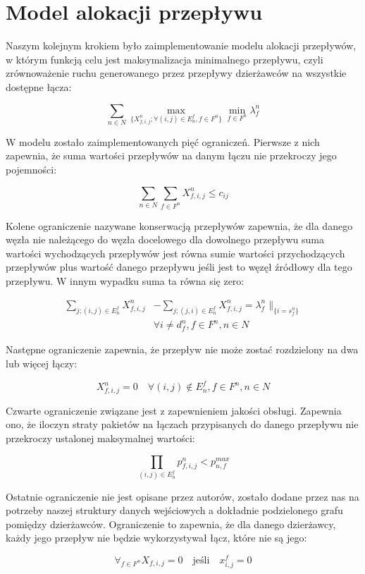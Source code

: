 \section{Model alokacji przepływu}

Naszym kolejnym krokiem było zaimplementowanie modelu alokacji przepływów, w
którym funkcją celu jest maksymalizacja minimalnego przepływu, czyli zrównoważenie
ruchu generowanego przez przepływy dzierżawców na wszystkie dostępne łącza:

\begin{equation}
  \sum_{n \in N} \max_{\{X_{f,i,j}^n;\forall{(i,j)} \in E_n^f,f \in F^n\}} \min_{f \in F^n}\lambda_f^n
\end{equation}

W modelu zostało zaimplementowanych pięć ograniczeń. Pierwsze z nich zapewnia,
że suma wartości przepływów na danym łączu nie przekroczy jego pojemności:

\begin{equation}
  \sum_{n \in N} \sum_{f \in F^n} X_{f,i,j}^n \le c_{ij}
\end{equation}

Kolene ograniczenie nazywane konserwacją przepływów zapewnia, że dla danego węzła
nie należącego do węzła docelowego dla dowolnego przepływu suma wartości wychodzących
przepływów jest równa sumie wartości przychodzących przepływów plus wartość danego
przepływu jeśli jest to węzęł źródłowy dla tego przepływu. W innym wypadku suma ta
równa się zero:

\begin{equation}
\begin{align*}
  \sum_{j;(i,j) \in E_n^f} X_{f,i,j}^n &- \sum_{j;(j,i) \in E_n^f} X_{f,i,j}^n = \lambda_f^n \parallel_{\{i=s_f^n\}} \\
  & \forall{i} \ne d_f^n, f \in F^n, n \in N
\end{align*}
\end{equation}

Następne ograniczenie zapewnia, że przepływ nie może zostać rozdzielony na
dwa lub więcej łączy:

\begin{equation}
  X_{f,i,j}^n = 0 \quad \forall(i,j) \notin E_n^f, f \in F^n, n \in N
\end{equation}

Czwarte ograniczenie związane jest z zapewnieniem jakości obsługi. Zapewnia ono, że
iloczyn straty pakietów na łączach przypisanych do danego przepływu nie przekroczy
ustalonej maksymalnej wartości:

\begin{equation}
  \prod_{(i,j) \in E_n^f} p_{f,i,j}^n < p_{n,f}^{max}
\end{equation}

Ostatnie ograniczenie nie jest opisane przez autorów, zostało dodane przez nas
na potrzeby naszej struktury danych wejściowych a dokładnie podzielonego grafu pomiędzy
dzierżawców. Ograniczenie to zapewnia, że dla danego dzierżawcy, każdy jego przepływ
nie będzie wykorzystywał łącz, które nie są jego:

\begin{equation}
  \forall_{f \in F^n} X_{f,i,j} = 0 \quad \text{jeśli}\quad x_{i,j}^f = 0
\end{equation}
